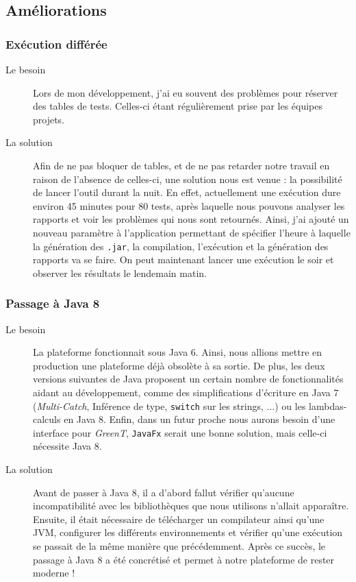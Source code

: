 \subsection{Améliorations}
	\subsubsection{Exécution différée} %
	\begin{description}
		\item[Le besoin] Lors de mon développement, j'ai eu souvent des problèmes pour réserver des tables de tests. Celles-ci étant régulièrement prise par les équipes projets. 
		\item[La solution] Afin de ne pas bloquer de tables, et de ne pas retarder notre travail en raison de l'absence de celles-ci, une solution nous est venue : la possibilité de lancer l'outil durant la nuit. En effet, actuellement une exécution dure environ 45 minutes pour 80 tests, après laquelle nous pouvons analyser les rapports et voir les problèmes qui nous sont retournés. Ainsi, j'ai ajouté un nouveau paramètre à l'application permettant de spécifier l'heure à laquelle la génération des \texttt{.jar}, la compilation, l'exécution et la génération des rapports va se faire. On peut maintenant lancer une exécution le soir et observer les résultats le lendemain matin.
	\end{description}
	
	\subsubsection{Passage à Java 8}
		\begin{description}
			\item[Le besoin] La plateforme fonctionnait sous Java 6. Ainsi, nous allions mettre en production une plateforme déjà obsolète à sa sortie. De plus, les deux versions suivantes de Java proposent un certain nombre de fonctionnalités aidant au développement, comme des simplifications d'écriture en Java 7 (\textit{Multi-Catch}, Inférence de type, \texttt{switch} sur les strings, ...) ou les lambdas-calculs en Java 8. Enfin, dans un futur proche nous aurons besoin d'une interface pour \textit{GreenT}, \texttt{JavaFx} serait une bonne solution, mais celle-ci nécessite Java 8.
			\item[La solution] Avant de passer à Java 8, il a d'abord fallut vérifier qu'aucune incompatibilité avec les bibliothèques que nous utilisons n'allait apparaître. Ensuite, il était nécessaire de télécharger un compilateur ainsi qu'une JVM, configurer les différents environnements et vérifier qu'une exécution se passait de la même manière que précédemment. Après ce succès, le passage à Java 8 a été concrétisé et permet à notre plateforme de rester moderne ! 
		\end{description}
		
